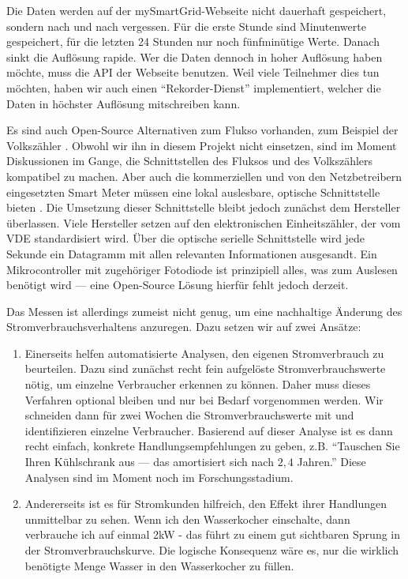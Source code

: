 \documentclass[12pt,BCOR=8.5mm]{scrartcl}
\begin{document}
Die Daten werden auf der mySmartGrid-Webseite nicht dauerhaft
gespeichert, sondern nach und nach vergessen. Für die erste Stunde sind
Minutenwerte gespeichert, für die letzten 24 Stunden nur noch
fünfminütige Werte. Danach sinkt die Auflösung rapide. Wer die Daten
dennoch in hoher Auflösung haben möchte, muss die API der Webseite
benutzen. Weil viele Teilnehmer dies tun möchten, haben wir auch einen
"`Rekorder-Dienst"' implementiert, welcher die Daten in höchster
Auflösung mitschreiben kann. 

Es sind auch Open-Source Alternativen zum Flukso vorhanden, zum Beispiel
der Volkszähler . Obwohl wir ihn in diesem Projekt nicht einsetzen, sind
im Moment Diskussionen im Gange, die Schnittstellen des Fluksos und des
Volkszählers kompatibel zu machen. Aber auch die kommerziellen und von
den Netzbetreibern eingesetzten Smart Meter müssen eine lokal
auslesbare, optische Schnittstelle bieten .  Die Umsetzung dieser Schnittstelle bleibt jedoch
zunächst dem Hersteller überlassen. Viele Hersteller setzen auf den
elektronischen Einheitszähler, der vom VDE  standardisiert wird. Über die optische serielle
Schnittstelle wird jede Sekunde ein Datagramm mit allen relevanten
Informationen ausgesandt. Ein Mikrocontroller mit zugehöriger Fotodiode
ist prinzipiell alles, was zum Auslesen benötigt wird --- eine
Open-Source Lösung hierfür fehlt jedoch derzeit.

Das Messen ist allerdings zumeist nicht genug, um eine nachhaltige
Änderung des Stromverbrauchsverhaltens anzuregen. Dazu setzen wir auf
zwei Ansätze:

\begin{enumerate}
  \item Einerseits helfen automatisierte Analysen, den eigenen
    Stromverbrauch zu beurteilen. Dazu sind zunächst recht fein
    aufgelöste Stromverbrauchswerte nötig, um einzelne Verbraucher
    erkennen zu können. Daher muss dieses Verfahren optional bleiben und
    nur bei Bedarf vorgenommen werden. Wir schneiden dann für zwei
    Wochen die Stromverbrauchswerte mit und identifizieren einzelne
    Verbraucher. Basierend auf dieser Analyse ist es dann recht einfach,
    konkrete Handlungsempfehlungen zu geben, z.B. "`Tauschen Sie Ihren
    Kühlschrank aus --- das amortisiert sich nach $2,4$ Jahren."' 
    Diese Analysen sind im Moment noch im Forschungsstadium.
  \item Andererseits ist es für Stromkunden hilfreich, den Effekt ihrer
    Handlungen unmittelbar zu sehen. Wenn ich den Wasserkocher
    einschalte, dann verbrauche ich auf einmal 2kW - das führt zu einem
    gut sichtbaren Sprung in der Stromverbrauchskurve. Die logische
    Konsequenz wäre es, nur die wirklich benötigte Menge Wasser in den
    Wasserkocher zu füllen.
\end{enumerate}
\end{document}
